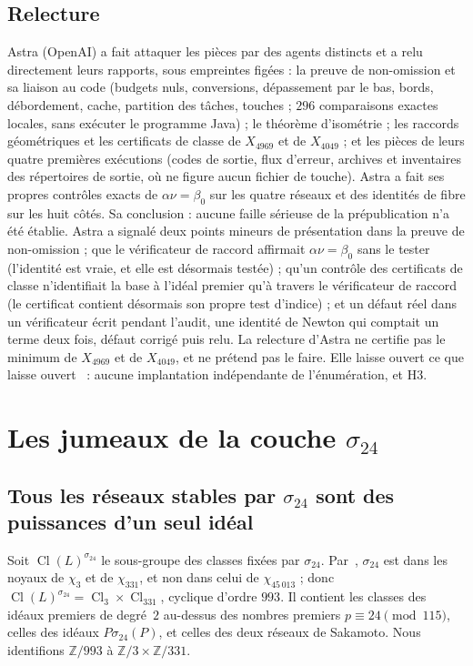 \documentclass[11pt,a4paper]{amsart}
\theoremstyle{plain}
\theoremstyle{definition}
\newcommand{\Z}{\mathbb{Z}}
\DeclareMathOperator{\Cl}{Cl}
\begin{document}
\subsection{Relecture}\label{subsec:review}
Astra (OpenAI) a fait attaquer les pièces par des agents distincts et a relu directement leurs rapports, sous empreintes figées : la preuve de non-omission et sa liaison au code (budgets nuls, conversions, dépassement par le bas, bords, débordement, cache, partition des tâches, touches ; $296$ comparaisons exactes locales, sans exécuter le programme Java) ; le théorème d'isométrie ; les raccords géométriques et les certificats de classe de $X_{4969}$ et de $X_{4049}$ ; et les pièces de leurs quatre premières exécutions (codes de sortie, flux d'erreur, archives et inventaires des répertoires de sortie, où ne figure aucun fichier de touche). Astra a fait ses propres contrôles exacts de $\alpha\nu=\beta_0$ sur les quatre réseaux et des identités de fibre sur les huit côtés. Sa conclusion : aucune faille sérieuse de la prépublication n'a été établie. Astra a signalé deux points mineurs de présentation dans la preuve de non-omission ; que le vérificateur de raccord affirmait $\alpha\nu=\beta_0$ sans le tester (l'identité est vraie, et elle est désormais testée) ; qu'un contrôle des certificats de classe n'identifiait la base à l'idéal premier qu'à travers le vérificateur de raccord (le certificat contient désormais son propre test d'indice) ; et un défaut réel dans un vérificateur écrit pendant l'audit, une identité de Newton qui comptait un terme deux fois, défaut corrigé puis relu. La relecture d'Astra ne certifie pas le minimum de $X_{4969}$ et de $X_{4049}$, et ne prétend pas le faire. Elle laisse ouvert ce que laisse ouvert~\cite[\S5.4]{Gau26} : aucune implantation indépendante de l'énumération, et H3.

\section{Les jumeaux de la couche \texorpdfstring{$\sigma_{24}$}{sigma24}}\label{sec:layer}

\subsection{Tous les réseaux stables par \texorpdfstring{$\sigma_{24}$}{sigma24} sont des puissances d'un seul idéal}
Soit $\Cl(L)^{\sigma_{24}}$ le sous-groupe des classes fixées par $\sigma_{24}$. Par~\cite[prop.~2.5]{Gau26}, $\sigma_{24}$ est dans les noyaux de $\chi_3$ et de $\chi_{331}$, et non dans celui de $\chi_{45\,013}$ ; donc $\Cl(L)^{\sigma_{24}}=\Cl_3\times\Cl_{331}$, cyclique d'ordre $993$. Il contient les classes des idéaux premiers de degré~$2$ au-dessus des nombres premiers $p\equiv24\pmod{115}$, celles des idéaux $P\sigma_{24}(P)$, et celles des deux réseaux de Sakamoto. Nous identifions $\Z/993$ à $\Z/3\times\Z/331$.
\end{document}
